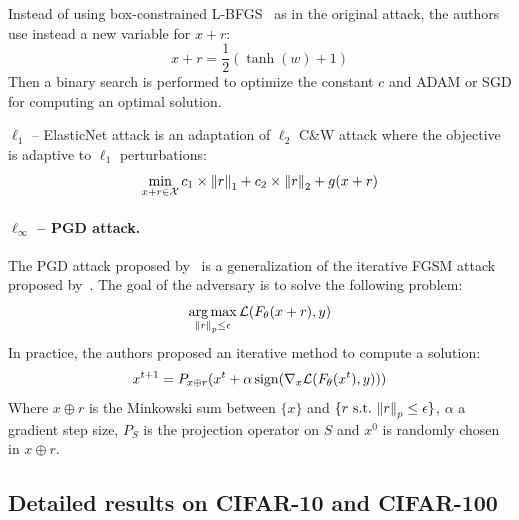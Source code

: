 Instead of using box-constrained L-BFGS~\cite{Szegedy2013IntriguingPO} as in the original attack, the authors use instead a new variable for $x+r$:
\begin{equation}
  x+r=\frac{1}{2} (\tanh(w)+1)
\end{equation}
\medbreak
Then a binary search is performed to optimize the constant $c$ and ADAM or SGD for computing an optimal solution.

$\ell_1$ -- ElasticNet attack is an adaptation of $\ell_2$ C\&W attack where the objective is adaptive to $\ell_1$ perturbations:
\begin{equation}
  \min_{x+r\in \mathcal{X} } c_1\times\norm{r}_1+c_2\times\norm{r}_2+g(x+r)
\end{equation}


\paragraph{$\ell_\infty$ -- PGD attack.}
The PGD attack proposed by~\citet{madry2018towards} is a generalization of the iterative FGSM attack proposed by~\citet{kurakin2016adversarial}. The goal of the adversary is to solve the following problem:
$$\operatorname*{arg\,max}_{\norm{r}_p \leq \epsilon} \mathcal{L}(F_{\theta}(x+r),y) $$
In practice, the authors proposed an iterative method to compute a solution:
$$x^{t+1}=P_{x \oplus r}(x^t+\alpha \operatorname{sign} (\nabla_x\mathcal{L}(F_\theta(x^t),y)))$$
Where $x \oplus r$ is the Minkowski sum between $\{x\}$ and $\{r \text{~s.t.~} \norm{r}_p \leq \epsilon\}$, $\alpha$ a gradient step size, $P_S$ is the projection operator on $S$ and $x^0$ is randomly chosen in $x \oplus r$. 

\subsection{Detailed results on CIFAR-10 and CIFAR-100}

